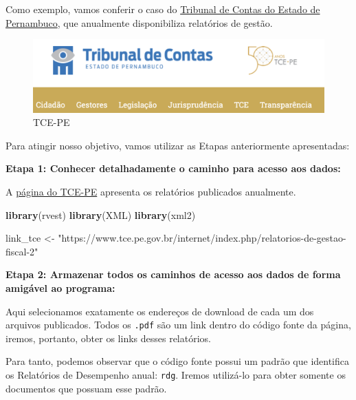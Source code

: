 \documentclass[]{book}
\newenvironment{Shaded}{\begin{snugshade}}{\end{snugshade}}
\newcommand{\KeywordTok}[1]{\textcolor[rgb]{0.13,0.29,0.53}{\textbf{#1}}}
\newcommand{\NormalTok}[1]{#1}
\newcommand{\StringTok}[1]{\textcolor[rgb]{0.31,0.60,0.02}{#1}}
\begin{document}
Como exemplo, vamos conferir o caso do \href{https://www.tce.pe.gov.br/internet/}{Tribunal de Contas do Estado de Pernambuco},
que anualmente disponibiliza relatórios de gestão.

\begin{figure}
\centering
\includegraphics[width=7.29167in,height=\textheight]{images/tce.png}
\caption{TCE-PE}
\end{figure}

Para atingir nosso objetivo, vamos utilizar as Etapas anteriormente apresentadas:

\textbf{Etapa 1: Conhecer detalhadamente o caminho para acesso aos dados:}

A \href{\%22https://www.tce.pe.gov.br/internet/index.php/relatorios-de-gestao-fiscal-2\%22}{página do TCE-PE} apresenta os relatórios publicados anualmente.

\begin{Shaded}
\begin{Highlighting}[]
\KeywordTok{library}\NormalTok{(rvest)}
\KeywordTok{library}\NormalTok{(XML)}
\KeywordTok{library}\NormalTok{(xml2)}

\NormalTok{link_tce <-}\StringTok{ "https://www.tce.pe.gov.br/internet/index.php/relatorios-de-gestao-fiscal-2"}
\end{Highlighting}
\end{Shaded}

\textbf{Etapa 2: Armazenar todos os caminhos de acesso aos dados de forma amigável ao programa:}

Aqui selecionamos exatamente os endereços de download de cada um dos arquivos publicados.
Todos os \texttt{.pdf} são um link dentro do código fonte da página, iremos, portanto, obter os
links desses relatórios.

Para tanto, podemos observar que o código fonte possui um padrão que identifica os
Relatórios de Desempenho anual: \texttt{rdg}. Iremos utilizá-lo para obter somente os documentos
que possuam esse padrão.
\end{document}
